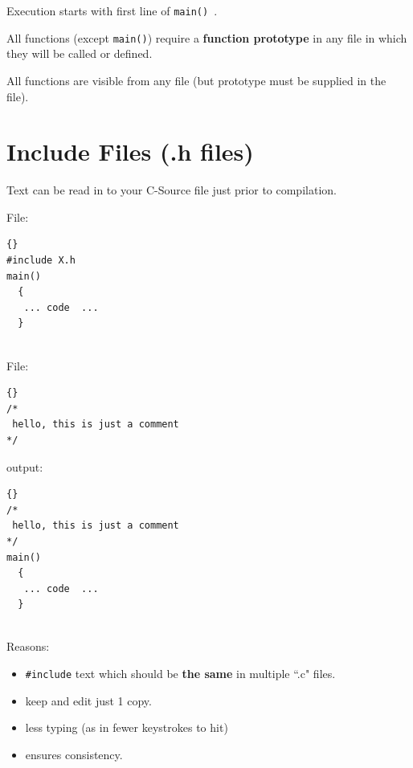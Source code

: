 
Execution starts with first line of {\tt main() }.

All functions (except {\tt main()}) require a {\bf function prototype}
in any file in which they will be called or defined. 

All functions are visible from any file (but prototype must be supplied in the file).

\section{Include Files (.h files)}
Text can be read in to your C-Source file just prior to compilation. 

File: 

\lstset{language=c}
\lstset{basicstyle=\ttfamily, commentstyle=\textit}
\begin{lstlisting}[frame=trbl]{}
#include X.h
main()
  {
   ... code  ...
  }
 
\end{lstlisting}
File: 

\lstset{language=c}
\lstset{basicstyle=\ttfamily, commentstyle=\textit}
\begin{lstlisting}[frame=trbl]{}
/*
 hello, this is just a comment
*/
\end{lstlisting}

output:

\lstset{language=c}
\lstset{basicstyle=\ttfamily, commentstyle=\textit}
\begin{lstlisting}[frame=trbl]{}
/*
 hello, this is just a comment
*/
main()
  {
   ... code  ...
  }
 
\end{lstlisting}



Reasons:
\begin{itemize}
	\item {\tt \#include} text which should be {\bf the same} in multiple ``.c" files. 
	\item keep and edit just 1 copy.
	\item less typing (as in fewer keystrokes to hit)
    \item ensures consistency.
\end{itemize}

